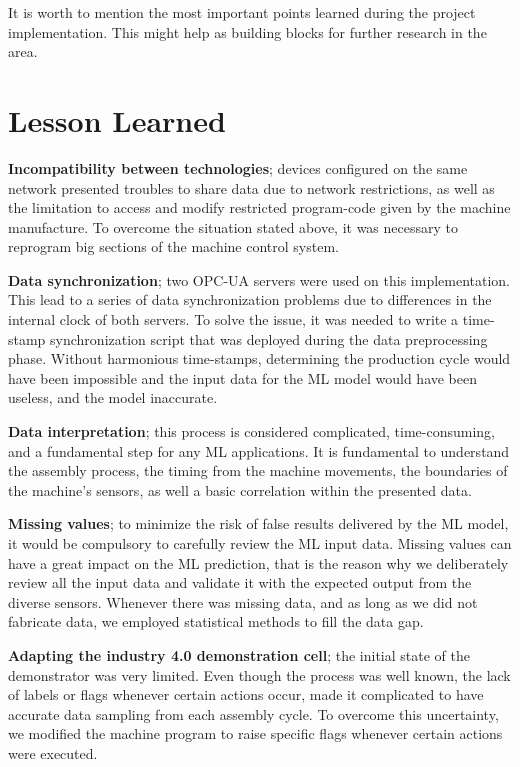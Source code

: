 \documentclass[5p,times,procedia]{elsarticle}
\begin{document}
It is worth to mention the most important points learned during the project implementation. This might help as building blocks for further research in the area.

\section{Lesson Learned} \label{sec:lessons} %

\textbf{Incompatibility between technologies}; devices configured on the same network presented troubles to share data due to network restrictions, as well as the limitation to access and modify restricted program-code given by the machine manufacture. 
To overcome the situation stated above, it was necessary to reprogram big sections of the machine control system.

\textbf{Data synchronization}; two OPC-UA servers were used on this implementation. This lead to a series of data synchronization problems due to differences in the internal clock of both servers.
To solve the issue, it was needed to write a time-stamp synchronization script that was deployed during the data preprocessing phase. Without harmonious time-stamps, determining the production cycle would have been impossible and the input data for the ML model would have been useless, and the model inaccurate. 

\textbf{Data interpretation}; this process is considered complicated, time-consuming, and a fundamental step for any ML applications. It is fundamental to understand the assembly process, the timing from the machine movements, the boundaries of the machine's sensors, as well a basic correlation within the presented data.

\textbf{Missing values}; to minimize the risk of false results delivered by the ML model, it would be compulsory to carefully review the ML input data. Missing values can have a great impact on the ML prediction, that is the reason why we deliberately review all the input data and validate it with the expected output from the diverse sensors. Whenever there was missing data, and as long as we did not fabricate data, we employed statistical methods to fill the data gap.

\textbf{Adapting the industry 4.0 demonstration cell}; the initial state of the demonstrator was very limited. Even though the process was well known, the lack of labels or flags whenever certain actions occur, made it complicated to have accurate data sampling from each assembly cycle. To overcome this uncertainty, we modified the machine program to raise specific flags whenever certain actions were executed.
\end{document}
